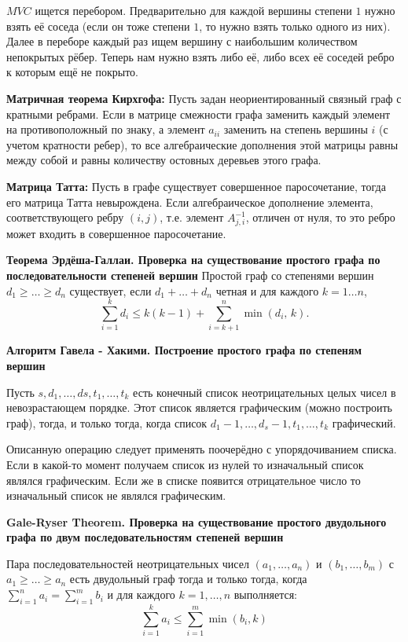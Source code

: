 $MVC$ ищется перебором. Предварительно для каждой вершины степени $1$ нужно взять её соседа (если он тоже степени $1$, то
нужно взять только одного из них). Далее в переборе каждый раз ищем вершину с наибольшим количеством непокрытых рёбер.
Теперь нам нужно взять либо её, либо всех её соседей ребро к которым ещё не покрыто.

\textbf{Матричная теорема Кирхгофа:}
Пусть задан неориентированный связный граф с кратными ребрами. Если в матрице смежности графа заменить каждый элемент на противоположный по знаку,
а элемент $a_{ii}$ заменить на степень вершины $i$ (с учетом кратности ребер), то все алгебраические дополнения этой матрицы равны между собой
и равны количеству остовных деревьев этого графа.

\textbf{Матрица Татта:}
Пусть в графе существует совершенное паросочетание, тогда его матрица Татта невырождена. Если алгебраическое дополнение элемента,
соответствующего ребру $(i, j)$, т.е. элемент $A_{j,i}^{-1}$, отличен от нуля, то это ребро может входить в совершенное паросочетание.

\textbf{Теорема Эрдёша-Галлаи. Проверка на существование простого графа по последовательности степеней вершин}
Простой граф со степенями вершин $d_1 \geq \ldots \geq d_n$ существует, если $d_1 + \ldots + d_n$ четная и для каждого $k = 1 \ldots n$,
$$
  \sum_{i = 1}^{k} d_i \leq k (k - 1) + \sum_{i = k + 1}^n \min(d_i, \, k).
$$

\textbf{Алгоритм Гавела - Хакими. Построение простого графа по степеням вершин}

Пусть $s, d_1, \ldots,ds ,t_1, \ldots, t_k$ есть конечный список неотрицательных целых чисел в невозрастающем порядке. Этот список является графическим (можно построить граф), тогда, и только тогда, когда список
$d_{1}-1,\dots ,d_{s}-1,t_{1},\dots ,t_{k}$ графический.

Описанную операцию следует применять поочерёдно с упорядочиванием списка. Если в какой-то момент получаем список из нулей то изначальный список являлся графическим. Если же в списке появится отрицательное число то изначальный список не являлся графическим.

\textbf{Gale-Ryser Theorem. Проверка на существование простого двудольного графа по двум последовательностям степеней вершин}

Пара последовательностей неотрицательных чисел $(a_1, \ldots, a_n)$ и $(b_1, \ldots, b_m)$ с $a_1 \geq \ldots \geq a_n$ есть двудольный граф тогда и только тогда, когда 
$
  \sum_{i = 1}^{n} a_i = \sum_{i = 1}^{m} b_i
$
и для каждого $k = 1, \ldots, n$ выполняется:
$$
  \sum_{i = 1}^{k} a_i \leq \sum_{i = 1}^{m} \min(b_i, k)
$$